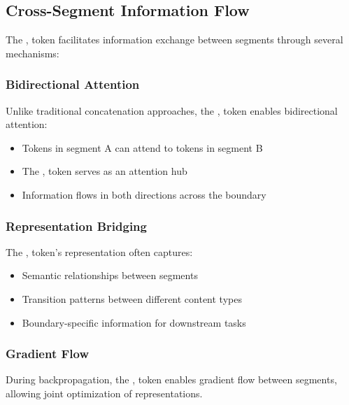 \subsection{Cross-Segment Information Flow}

The \sep{} token facilitates information exchange between segments through several mechanisms:

\subsubsection{Bidirectional Attention}
Unlike traditional concatenation approaches, the \sep{} token enables bidirectional attention:
\begin{itemize}
\item Tokens in segment A can attend to tokens in segment B
\item The \sep{} token serves as an attention hub
\item Information flows in both directions across the boundary
\end{itemize}

\subsubsection{Representation Bridging}
The \sep{} token's representation often captures:
\begin{itemize}
\item Semantic relationships between segments
\item Transition patterns between different content types
\item Boundary-specific information for downstream tasks
\end{itemize}

\subsubsection{Gradient Flow}
During backpropagation, the \sep{} token enables gradient flow between segments, allowing joint optimization of representations.

